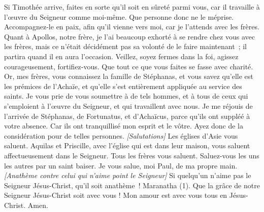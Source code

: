 \begin{multicols}{2}
Si Timothée arrive, faites en sorte qu'il soit en sûreté parmi vous, car il travaille à l’œuvre du Seigneur comme moi-même.
Que personne donc ne le méprise. Accompagnez-le en paix, afin qu'il vienne vers moi, car je l'attends avec les frères.
Quant à Apollos, notre frère, je l'ai beaucoup exhorté à se rendre chez vous avec les frères, mais ce n’était décidément pas sa volonté de le faire maintenant ; il partira quand il en aura l’occasion.
Veillez, soyez fermes dans la foi, agissez courageusement, fortifiez-vous.
Que tout ce que vous faites se fasse avec charité.
Or, mes frères, vous connaissez la famille de Stéphanas, et vous savez qu'elle est les prémices de l'Achaïe, et qu’elle s’est entièrement appliquée au service des saints.
Je vous prie de vous soumettre à de tels hommes, et à tous de ceux qui s’emploient à l’œuvre du Seigneur, et qui travaillent avec nous.
Je me réjouis de l’arrivée de Stéphanas, de Fortunatus, et d’Achaïcus, parce qu'ils ont suppléé à votre absence.
Car ils ont tranquillisé mon esprit et le vôtre. Ayez donc de la considération pour de telles personnes.
\textit{[Salutations]}
Les églises d'Asie vous saluent. Aquilas et Priscille, avec l'église qui est dans leur maison, vous saluent affectueusement dans le Seigneur.
Tous les frères vous saluent. Saluez-vous les uns les autres par un saint baiser.
Je vous salue, moi Paul, de ma propre main.
\textit{[Anathème contre celui qui n'aime point le Seigneur]}
Si quelqu'un n'aime pas le Seigneur Jésus-Christ, qu'il soit anathème ! Maranatha (1).
Que la grâce de notre Seigneur Jésus-Christ soit avec vous !
Mon amour est avec vous tous en Jésus-Christ. Amen.
\PPE{}
\end{multicols}
